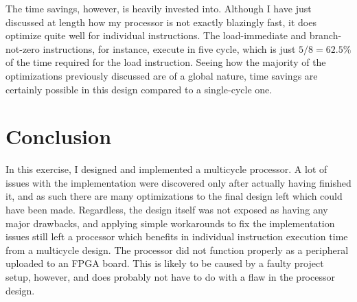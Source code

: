 \documentclass[11pt]{article}
\begin{document}
The time savings, however, is heavily invested into. Although I have
just discussed at length how my processor is not exactly blazingly
fast, it does optimize quite well for individual instructions. The
load-immediate and branch-not-zero instructions, for instance, execute
in five cycle, which is just $5/8 = 62.5\%$ of the time required for
the load instruction. Seeing how the majority of the optimizations
previously discussed are of a global nature, time savings are
certainly possible in this design compared to a single-cycle one.

\section{Conclusion}
\label{sec:conclusion}
In this exercise, I designed and implemented a multicycle processor. A
lot of issues with the implementation were discovered only after
actually having finished it, and as such there are many optimizations
to the final design left which could have been made. Regardless, the
design itself was not exposed as having any major drawbacks, and
applying simple workarounds to fix the implementation issues still
left a processor which benefits in individual instruction execution
time from a multicycle design. The processor did not function properly
as a peripheral uploaded to an FPGA board. This is likely to be caused
by a faulty project setup, however, and does probably not have to do
with a flaw in the processor design.



\end{document}
